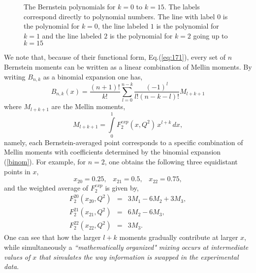\documentclass[
twocolumn,
aps,prd,
nofootinbib,
superscriptaddress,
showpacs,ligh
tightenlines, 
]{revtex4}
\begin{document}
\begin{figure}[htp]
\caption[Bernstein Polynomials]{The Bernstein polynomials for $k=0$ to $k=15$.  The labels correspond directly to polynomial numbers.  The line with label $0$ is the polynomial for $k=0$, the line labeled $1$ is the polynomial for $k=1$ and the line labeled $2$ is the polynomial for $k=2$ going up to $k=15$}  
\label{fig:Bernpoly}
\end{figure}
We note that, because of their functional form, Eq.(\ref{eq:171}), every set of $n$ Bernstein moments can be written as a linear combination of Mellin moments.
By writing $B_{n,k}$ as a binomial expansion one has,
\begin{equation}
B_{n,k}(x) = \frac{(n+1)!}{k!} \sum_{l=0}^{n-k} \frac{(-1)^l}{l! (n-k-l)!} M_{l+k+1}
\label{binom}
\end{equation}
where $M_{l+k+1}$ are the Mellin moments,
\begin{equation}
M_{l+k+1} = \int\limits_0^1 F_2^{exp}(x, Q^2) \, x^{l+k} \, dx,
\end{equation}
namely, each Bernstein-averaged point corresponds to a specific combination of Mellin moments with coefficients determined by the binomial expansion (\ref{binom}). For example, for $n=2$, one obtains the following three equidistant points in $x$, 
\[ x_{20} = 0.25, \;\;\;  x_{21}=0.5, \;\;\; x_{22} =0.75, \]
and the weighted average of $F_2^{exp}$ is given by,
\begin{subequations}
\begin{eqnarray}
\label{berns3_x1}
F^{20}_2(x_{20},Q^2)& = & 3 M_{1} - 6 M_{2} + 3 M_{3},
\\
F^{21}_2(x_{21},Q^2) & = & 6 M_{2} - 6 M_3
,
\\   
F_2^{22}(x_{22},Q^2) & = & 3 M_3. 
\end{eqnarray}
\end{subequations}
One can see that how  the larger $l+k$ moments gradually contribute at larger $x$, while simultaneously  a {\em ``mathematically organized" mixing occurs at intermediate values of $x$ that simulates the way information is swapped in the experimental data}.
\end{document}

